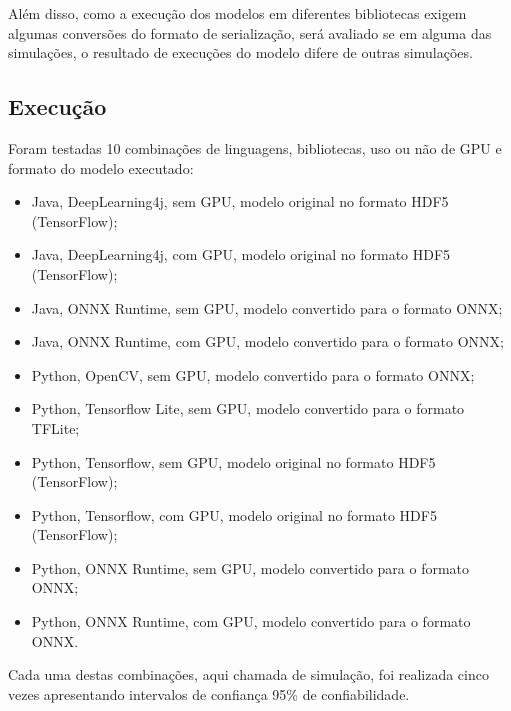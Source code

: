 Além disso, como a execução dos modelos em diferentes bibliotecas exigem algumas conversões do formato de serialização, será avaliado se em alguma das simulações, o resultado de execuções do modelo difere de outras simulações.

\subsection{Execução}

Foram testadas 10 combinações de linguagens, bibliotecas, uso ou não de GPU e formato do modelo executado:

\begin{itemize}
  \item Java, DeepLearning4j, sem GPU, modelo original no formato HDF5 (TensorFlow);
  \item Java, DeepLearning4j, com GPU, modelo original no formato HDF5 (TensorFlow);
  \item Java, ONNX Runtime, sem GPU, modelo convertido para o formato ONNX;
  \item Java, ONNX Runtime, com GPU, modelo convertido para o formato ONNX;
  \item Python, OpenCV, sem GPU, modelo convertido para o formato ONNX;
  \item Python, Tensorflow Lite, sem GPU, modelo convertido para o formato TFLite;
  \item Python, Tensorflow, sem GPU, modelo original no formato HDF5 (TensorFlow);
  \item Python, Tensorflow, com GPU, modelo original no formato HDF5 (TensorFlow);
  \item Python, ONNX Runtime, sem GPU, modelo convertido para o formato ONNX;
  \item Python, ONNX Runtime, com GPU, modelo convertido para o formato ONNX.
\end{itemize}

Cada uma destas combinações, aqui chamada de simulação, foi realizada cinco vezes apresentando intervalos de confiança 95\% de confiabilidade.